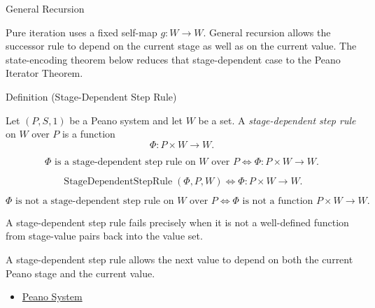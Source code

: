 \begin{topicbox}{General Recursion}
\begin{exposition}
Pure iteration uses a fixed self-map $g:W\to W$. General recursion allows the
successor rule to depend on the current stage as well as on the current value.
The state-encoding theorem below reduces that stage-dependent case to the
Peano Iterator Theorem.
\end{exposition}

\begin{definitionbox}{Definition (Stage-Dependent Step Rule)}
\begin{definition}
\label{def:stage-dependent-step-rule}
Let $(P,S,1)$ be a Peano system and let $W$ be a set. A
\emph{stage-dependent step rule} on $W$ over $P$ is a function
\[
\Phi:P\times W\to W.
\]
\end{definition}
\end{definitionbox}

\begin{remark*}
\[
\Phi \text{ is a stage-dependent step rule on } W \text{ over } P
\Longleftrightarrow
\Phi:P\times W\to W.
\]
\end{remark*}

\begin{remark*}
\[
\operatorname{StageDependentStepRule}(\Phi,P,W)
\Longleftrightarrow
\Phi:P\times W\to W.
\]
\end{remark*}

\begin{remark*}
\[
\Phi \text{ is not a stage-dependent step rule on } W \text{ over } P
\Longleftrightarrow
\Phi \text{ is not a function } P\times W\to W.
\]
\end{remark*}

\begin{remark*}
A stage-dependent step rule fails precisely when it is not a well-defined
function from stage-value pairs back into the value set.
\end{remark*}

\begin{remark*}[Interpretation]
A stage-dependent step rule allows the next value to depend on both the
current Peano stage and the current value.
\end{remark*}

\begin{dependencies}
\begin{itemize}
  \item \hyperref[def:peano-system]{Peano System}
\end{itemize}
\end{dependencies}


\end{topicbox}
